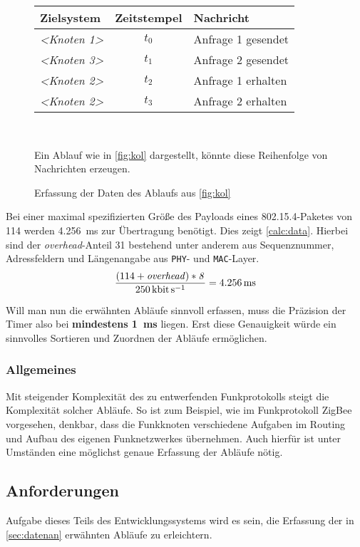 \begin{figure}[!ht]
\centering
\par\begin{tabu}{l c l}
Zielsystem & Zeitstempel & Nachricht\\
\hline
\emph{<Knoten 1>} & \emph{$t_0$} & Anfrage 1 gesendet\\ 
\emph{<Knoten 3>} & \emph{$t_1$} & Anfrage 2 gesendet\\
\emph{<Knoten 2>} & \emph{$t_2$} & Anfrage 1 erhalten\\
\emph{<Knoten 2>} & \emph{$t_3$} & Anfrage 2 erhalten\\
\hline
\end{tabu}\\
\caption{Erfassung der Daten des Ablaufs aus \autoref{fig:kol}}{Ein Ablauf
wie in \autoref{fig:kol} dargestellt, könnte diese Reihenfolge von
Nachrichten erzeugen.}
\label{fig:kolmsg}
\end{figure}

Bei einer maximal spezifizierten Größe des Payloads eines
802.15.4-Paketes von \SI{114}{\byte} werden \SI{4.256}{\milli\second}
zur Übertragung benötigt. Dies zeigt \autoref{calc:data}. Hierbei sind der
\emph{overhead}-Anteil \SI{31}{\byte} bestehend unter anderem aus
Sequenznummer, Adressfeldern und Längenangabe aus \texttt{PHY}- und
\texttt{MAC}-Layer.
\begin{align}\label{calc:data}
\frac{(114+\mathit{overhead)*8}}{\SI{250}{\kilo\bit\per\second}}=\SI{4.256}{\milli\second}
\end{align}

Will man nun die erwähnten Abläufe sinnvoll erfassen, muss die Präzision der
Timer also bei \textbf{mindestens \SI{1}{\milli\second}} liegen. Erst diese
Genauigkeit würde ein sinnvolles Sortieren und Zuordnen der Abläufe ermöglichen.
\subsubsection*{Allgemeines}
Mit steigender Komplexität des zu entwerfenden Funkprotokolls steigt die
Komplexität solcher Abläufe. So ist zum Beispiel, wie im Funkprotokoll ZigBee
vorgesehen, denkbar, dass die Funkknoten verschiedene Aufgaben im Routing und
Aufbau des eigenen Funknetzwerkes übernehmen. Auch hierfür ist unter
Umständen eine möglichst genaue Erfassung der Abläufe nötig.

\subsection{Anforderungen}
Aufgabe dieses Teils des Entwicklungssystems wird es sein, die Erfassung der in
\autoref{sec:datenan} erwähnten Abläufe zu erleichtern.

